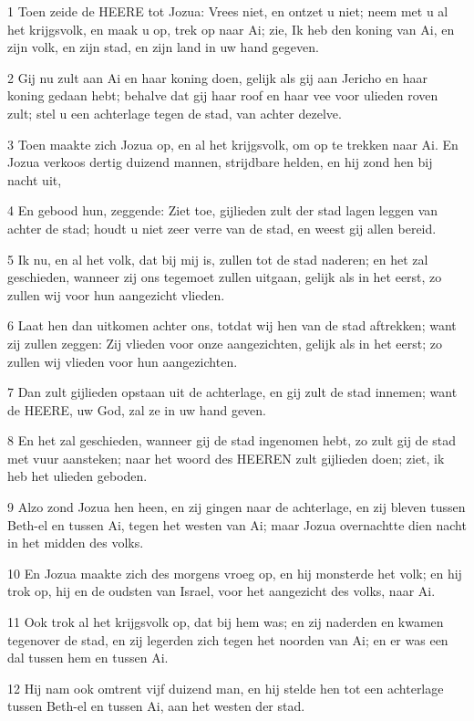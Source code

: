 \par 1 Toen zeide de HEERE tot Jozua: Vrees niet, en ontzet u niet; neem met u al het krijgsvolk, en maak u op, trek op naar Ai; zie, Ik heb den koning van Ai, en zijn volk, en zijn stad, en zijn land in uw hand gegeven.
\par 2 Gij nu zult aan Ai en haar koning doen, gelijk als gij aan Jericho en haar koning gedaan hebt; behalve dat gij haar roof en haar vee voor ulieden roven zult; stel u een achterlage tegen de stad, van achter dezelve.
\par 3 Toen maakte zich Jozua op, en al het krijgsvolk, om op te trekken naar Ai. En Jozua verkoos dertig duizend mannen, strijdbare helden, en hij zond hen bij nacht uit,
\par 4 En gebood hun, zeggende: Ziet toe, gijlieden zult der stad lagen leggen van achter de stad; houdt u niet zeer verre van de stad, en weest gij allen bereid.
\par 5 Ik nu, en al het volk, dat bij mij is, zullen tot de stad naderen; en het zal geschieden, wanneer zij ons tegemoet zullen uitgaan, gelijk als in het eerst, zo zullen wij voor hun aangezicht vlieden.
\par 6 Laat hen dan uitkomen achter ons, totdat wij hen van de stad aftrekken; want zij zullen zeggen: Zij vlieden voor onze aangezichten, gelijk als in het eerst; zo zullen wij vlieden voor hun aangezichten.
\par 7 Dan zult gijlieden opstaan uit de achterlage, en gij zult de stad innemen; want de HEERE, uw God, zal ze in uw hand geven.
\par 8 En het zal geschieden, wanneer gij de stad ingenomen hebt, zo zult gij de stad met vuur aansteken; naar het woord des HEEREN zult gijlieden doen; ziet, ik heb het ulieden geboden.
\par 9 Alzo zond Jozua hen heen, en zij gingen naar de achterlage, en zij bleven tussen Beth-el en tussen Ai, tegen het westen van Ai; maar Jozua overnachtte dien nacht in het midden des volks.
\par 10 En Jozua maakte zich des morgens vroeg op, en hij monsterde het volk; en hij trok op, hij en de oudsten van Israel, voor het aangezicht des volks, naar Ai.
\par 11 Ook trok al het krijgsvolk op, dat bij hem was; en zij naderden en kwamen tegenover de stad, en zij legerden zich tegen het noorden van Ai; en er was een dal tussen hem en tussen Ai.
\par 12 Hij nam ook omtrent vijf duizend man, en hij stelde hen tot een achterlage tussen Beth-el en tussen Ai, aan het westen der stad.
